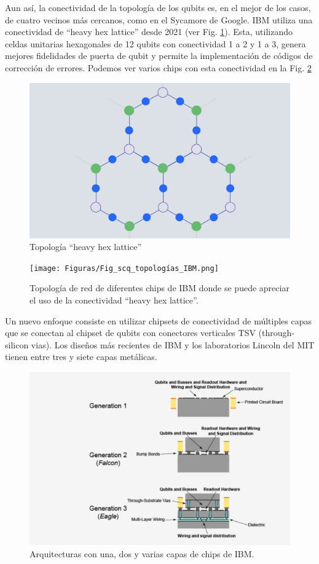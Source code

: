 Aun así, la conectividad de la topología de los qubits es, en el mejor de los casos, de cuatro vecinos más cercanos, como en el Sycamore de Google. IBM utiliza una conectividad de ``heavy hex lattice'' desde 2021 (ver Fig. \ref{Fig_scq_hhl}). Esta, utilizando celdas unitarias hexagonales de 12 qubits con conectividad 1 a 2 y 1 a 3, genera mejores fidelidades de puerta de qubit y permite la implementación de códigos de corrección de errores. Podemos ver varios chips con esta conectividad en la Fig. \ref{Fig_scq_topologías_IBM}

	\begin{figure}[t]
	\centering 
	\includegraphics[width=0.5\linewidth]{Figuras/Fig_scq_hhl.png}
	\caption{Topología ``heavy hex lattice''}
	\label{Fig_scq_hhl}
	\end{figure}


	\begin{figure}[H]
	\centering 
	\texttt{[image: Figuras/Fig\_scq\_topologías\_IBM.png]}
	\caption{Topología de red de diferentes chips de IBM donde se puede apreciar el uso de la conectividad ``heavy hex lattice''. }
	\label{Fig_scq_topologías_IBM}
	\end{figure}


Un nuevo enfoque consiste en utilizar chipsets de conectividad de múltiples capas que se conectan al chipset de qubits con conectores verticales TSV (through-silicon vias). Los diseños más recientes de IBM y los laboratorios Lincoln del MIT tienen entre tres y siete capas metálicas. 

	\begin{figure}[H]
	\centering 
	\includegraphics[width=1\linewidth]{Figuras/Fig_scq_MLW.png}
	\caption{Arquitecturas con una, dos y varias capas de chips de IBM.}
	\label{Fig_scq_MLW}
	\end{figure}

